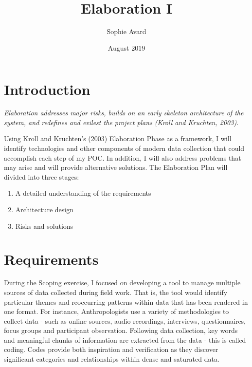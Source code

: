 \documentclass{article}
\title{Elaboration I}
\author{Sophie Avard }
\date{August 2019}
\begin{document}
\maketitle

\tableofcontents
\pagebreak

\section{Introduction}
\begin{center}
\textit{Elaboration addresses major risks, builds on an early skeleton architecture of the system, and redefines and evilest the project plans (Kroll and Kruchten, 2003)}.
\end{center}

Using Kroll and Kruchten’s (2003) Elaboration Phase as a framework, I will identify technologies and other components of modern data collection that could accomplish each step of my POC. In addition, I will also address problems that may arise and will provide alternative solutions. The Elaboration Plan will divided into three stages:
\begin{enumerate}
    \item A detailed understanding of the requirements
    \item Architecture design 
    \item Risks and solutions
\end{enumerate}

\section{Requirements}
During the Scoping exercise, I focused on developing a tool to manage multiple sources of data collected during field work. That is, the tool would identify particular themes and reoccurring patterns within data that has been rendered in one format. For instance, Anthropologists use a variety of methodologies to collect data - such as online sources, audio recordings, interviews, questionnaires, focus groups and participant observation. Following data collection, key words and meaningful chunks of information are extracted from the data - this is called coding. Codes provide both inspiration and verification as they discover significant categories and relationships within dense and saturated data. 
\end{document}
